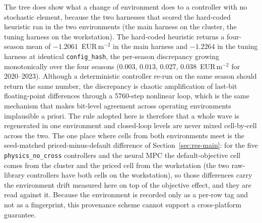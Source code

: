 The tree does show what a change of environment does to a controller with no stochastic
element, because the two harnesses that scored the hard-coded heuristic ran in the two
environments (the main harness on the cluster, the tuning harness on the workstation). The hard-coded
heuristic returns a four-season mean of $-1.2061$~EUR\,m$^{-2}$ in the main harness and
$-1.2264$ in the tuning harness at identical \texttt{config\_hash}, the per-season
discrepancy growing monotonically over the four seasons ($0.003$, $0.013$, $0.027$,
$0.038$~EUR\,m$^{-2}$ for 2020--2023). Although a deterministic controller re-run on the
same season should return the same number, the discrepancy is chaotic amplification of
last-bit floating-point differences through a 5760-step nonlinear loop, which is the same
mechanism that makes bit-level agreement across operating environments implausible a priori.
The rule adopted here is therefore that a whole wave is regenerated in one environment
and closed-loop levels are never mixed cell-by-cell across the two. The one place where
cells from both environments meet is the seed-matched priced-minus-default difference of
Section~\ref{sec:res-main}: for the five \texttt{physics\_no\_cross} controllers and the
neural MPC the default-objective cell comes from the cluster and the priced cell from the
workstation (the two raw-library controllers have both cells on the workstation), so those
differences carry the environment drift measured here on top of the objective effect, and
they are read against it. Because the environment is recorded only
as a per-row tag and not as a fingerprint, this provenance scheme cannot support
a cross-platform guarantee.


